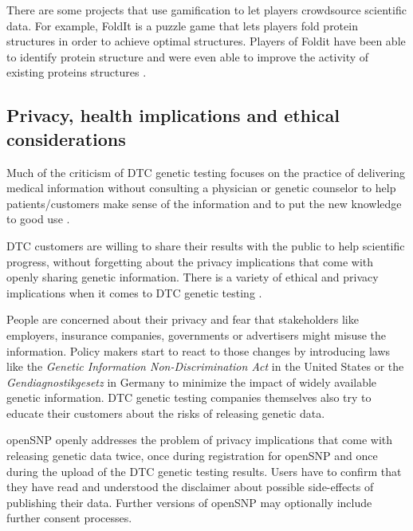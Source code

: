 \documentclass[10pt]{article}
\begin{document}
There are some projects that use gamification to let players crowdsource scientific data. For example, FoldIt is a puzzle game that lets players fold protein structures in order to achieve optimal structures. Players of Foldit have been able to identify protein structure and were even able to improve the activity of existing proteins structures \cite{Eiben2012}.



\subsection*{Privacy, health implications and ethical considerations}

Much of the criticism of DTC genetic testing focuses on the practice 
of delivering medical information without consulting a physician or genetic counselor to help patients/customers make sense of the information 
and to put the new knowledge to good use \cite{Hauskeller2011,Hogarth2008,Wasson2009}.  

DTC customers are willing to share their results with the public to help scientific progress, without forgetting about the privacy implications that come with openly sharing genetic information. There is a variety of ethical and privacy implications when it comes to DTC genetic testing \cite{Caulfield2011,Joh2011}. 

People are concerned about their privacy and fear that stakeholders like employers, insurance companies, governments or advertisers might misuse the information. Policy makers start to react to those changes by introducing laws like the 
\textit{Genetic Information Non-Discrimination Act} in the United States or the \emph{Gendiagnostikgesetz} in Germany to minimize the impact of
widely available genetic information. DTC genetic testing companies themselves also try to educate their customers about the risks of releasing genetic data.  

openSNP openly addresses the problem of privacy implications that come with releasing genetic data twice, once during registration for openSNP and once during 
the upload of the DTC genetic testing results. Users have to confirm that they have read and understood the disclaimer about possible side-effects 
of publishing their data. Further versions of openSNP may optionally include further consent processes.
\end{document}
